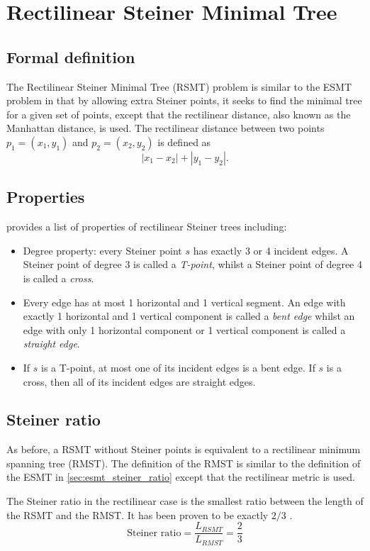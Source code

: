 \documentclass{l4proj}
\begin{document}
\section{Rectilinear Steiner Minimal Tree}
\subsection{Formal definition}
The Rectilinear Steiner Minimal Tree (RSMT) problem is similar to the ESMT problem in that by allowing extra Steiner points, it seeks to find the minimal tree for a given set of points, except that the rectilinear distance, also known as the Manhattan distance, is used. The rectilinear distance between two points $p_1 = (x_1, y_1)$ and $p_2 = (x_2, y_2)$ is defined as
$$|x_1 - x_2| + |y_1 - y_2|.$$
\subsection{Properties}
\cite{Brazil2015} provides a list of properties of rectilinear Steiner trees including:
\begin{itemize}
      \item Degree property: every Steiner point $s$ has exactly 3 or 4 incident edges. A Steiner point of degree 3 is called a \textit{T-point}, whilst a Steiner point of degree 4 is called a \textit{cross}.
      \item Every edge has at most 1 horizontal and 1 vertical segment. An edge with exactly 1 horizontal and 1 vertical component is called a \textit{bent edge} whilst an edge with only 1 horizontal component or 1 vertical component is called a \textit{straight edge}.
      \item If $s$ is a T-point, at most one of its incident edges is a bent edge. If $s$ is a cross, then all of its incident edges are straight edges.
\end{itemize}

\subsection{Steiner ratio}
As before, a RSMT without Steiner points is equivalent to a rectilinear minimum spanning tree (RMST). The definition of the RMST is similar to the definition of the ESMT in \ref{sec:esmt_steiner_ratio} except that the rectilinear metric is used.

The Steiner ratio in the rectilinear case is the smallest ratio between the length of the RSMT and the RMST. It has been proven to be exactly $2/3$ \cite{Brazil2015}.
$$
      \text{Steiner ratio} = \frac{L_{RSMT}}{L_{RMST}} = \frac{2}{3}
$$
\end{document}
